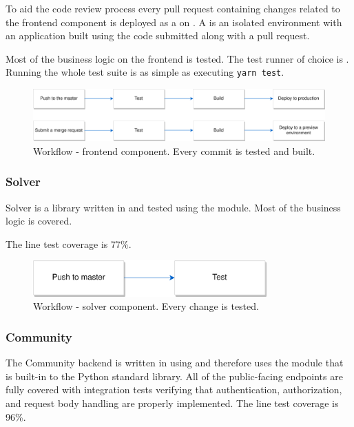 \medskip

To aid the code review process every pull request containing changes related to the frontend component is deployed as a  on . A  is an isolated environment with an application built using the code submitted along with a pull request.

\medskip

Most of the business logic on the frontend is tested. The test runner of choice is . Running the whole test suite is as simple as executing \texttt{yarn test}.

\begin{figure}[H]
  \caption{Workflow - frontend component. Every commit is tested and built.}
  \centering
    \includegraphics[width=\textwidth]{assets/3-frontend-pipeline.png}
\end{figure}

\subsubsection{Solver}

Solver is a library written in  and tested using the  module. Most of the business logic is covered. 

The line test coverage is 77\%.

\begin{figure}[H]
  \caption{Workflow - solver component. Every change is tested.}
  \centering
    \includegraphics[width=0.8\textwidth]{assets/3-solver-pipeline.png}
\end{figure}


\subsubsection{Community}

The Community backend is written in  using  and therefore uses the  module that is built-in to the Python standard library. All of the public-facing endpoints are fully covered with integration tests verifying that authentication, authorization, and request body handling are properly implemented. The line test coverage is 96\%.

